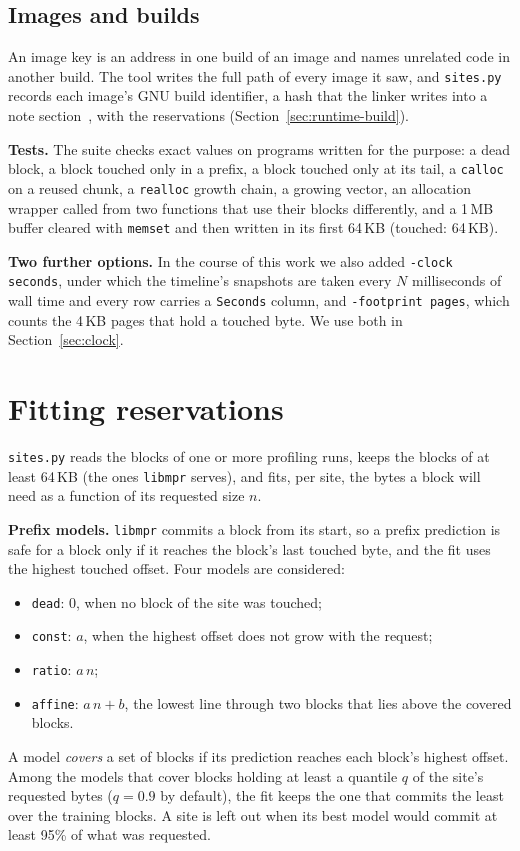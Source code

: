 \documentclass[11pt]{article}
\newcommand{\libmpr}{\texttt{libmpr}}
\newcommand{\secref}[1]{Section~\ref{#1}}
\newcommand{\term}[1]{\emph{#1}}
\begin{document}
\subsection{Images and builds}

An image key is an address in one build of an image and names unrelated code in another build. The tool writes
the full path of every image it saw, and \texttt{sites.py} records each image's GNU build identifier, a hash that
the linker writes into a note section~\cite{GNUld}, with the reservations (\secref{sec:runtime-build}).

\textbf{Tests.} The suite checks exact values on programs written for the purpose: a dead block, a block touched
only in a prefix, a block touched only at its tail, a \texttt{calloc} on a reused chunk, a \texttt{realloc} growth
chain, a growing vector, an allocation wrapper called from two functions that use their blocks differently, and
a 1\,MB buffer cleared with \texttt{memset} and then written in its first 64\,KB (touched: 64\,KB).

\textbf{Two further options.} In the course of this work we also added \texttt{-clock seconds}, under which the
timeline's snapshots are taken every $N$ milliseconds of wall time and every row carries a \texttt{Seconds}
column, and \texttt{-footprint pages}, which counts the 4\,KB pages that hold a touched byte. We use both in
\secref{sec:clock}.

\section{Fitting reservations}
\label{sec:fit}

\texttt{sites.py} reads the blocks of one or more profiling runs, keeps the blocks of at least 64\,KB (the ones
\libmpr{} serves), and fits, per site, the bytes a block will need as a function of its requested size $n$.

\textbf{Prefix models.} \libmpr{} commits a block from its start, so a prefix prediction is safe for a block only
if it reaches the block's last touched byte, and the fit uses the highest touched offset. Four models are
considered:
\begin{itemize}
  \item \texttt{dead}: $0$, when no block of the site was touched;
  \item \texttt{const}: $a$, when the highest offset does not grow with the request;
  \item \texttt{ratio}: $a\,n$;
  \item \texttt{affine}: $a\,n + b$, the lowest line through two blocks that lies above the covered blocks.
\end{itemize}
A model \term{covers} a set of blocks if its prediction reaches each block's highest offset. Among the models
that cover blocks holding at least a quantile $q$ of the site's requested bytes ($q = 0.9$ by default), the fit
keeps the one that commits the least over the training blocks. A site is left out when its best model would
commit at least 95\% of what was requested.
\end{document}
